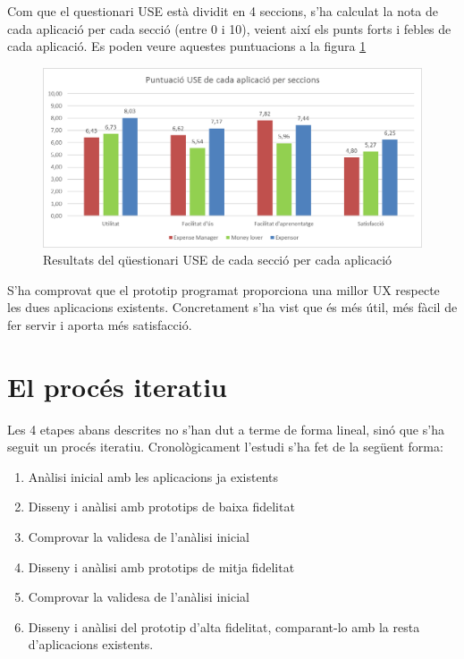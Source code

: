 Com que el questionari USE està dividit en 4 seccions, s'ha calculat la nota de cada aplicació per cada secció (entre 0 i 10), veient així els punts forts i febles de cada aplicació. Es poden veure aquestes puntuacions a la figura \ref{fig:USE_3}

\begin{figure}[htp]
\centering
\includegraphics[scale=0.7]{USE_3.png}
\caption{Resultats del qüestionari USE de cada secció per cada aplicació}\label{fig:USE_3}
\end{figure}

S'ha comprovat que el prototip programat proporciona una millor \ac{UX} respecte les dues aplicacions existents. Concretament s'ha vist que és més útil, més fàcil de fer servir i aporta més satisfacció. 

\section{El procés iteratiu}
Les 4 etapes abans descrites no s'han dut a terme de forma lineal, sinó que s'ha seguit un procés iteratiu. Cronològicament l'estudi s'ha fet de la següent forma:

\begin{enumerate}
\item Anàlisi inicial amb les aplicacions ja existents
\item Disseny i anàlisi amb prototips de baixa fidelitat
\item Comprovar la validesa de l'anàlisi inicial
\item Disseny i anàlisi amb prototips de mitja fidelitat
\item Comprovar la validesa de l'anàlisi inicial
\item Disseny i anàlisi del prototip d'alta fidelitat, comparant-lo amb la resta d'aplicacions existents.
\end{enumerate}

